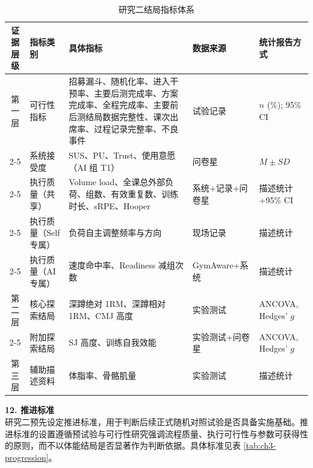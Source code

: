 \documentclass[UTF8,zihao=-4,twoside,openany]{ctexbook}
\begin{document}
\begin{table}[htbp]
  \centering
  \caption{研究二结局指标体系}
  \label{tab:ch3-outcomes}
  \vspace{6pt}
  \fontsize{8.5pt}{11pt}\selectfont
  \begin{tabularx}{\textwidth}{|c|m{2.5cm}|X|m{2.5cm}|m{2.5cm}|}
    \hline
    \textbf{证据层级} & \textbf{指标类别} & \textbf{具体指标} & \textbf{数据来源} & \textbf{统计报告方式} \\ \hline
    第一层 & 可行性指标 & 招募漏斗、随机化率、进入干预率、主要后测完成率、方案完成率、全程完成率、主要前后测结局数据完整性、课次出席率、过程记录完整率、不良事件 & 试验记录 & $n$ (\%); 95\% CI \\ \cline{2-5}
          & 系统接受度 & SUS、PU、Trust、使用意愿（AI 组 T1） & 问卷星 & $M \pm SD$ \\ \cline{2-5}
          & 执行质量（共享） & Volume load、全课总外部负荷、组数、有效重复数、训练时长、sRPE、Hooper & 系统+记录+问卷星 & 描述统计+95\% CI \\ \cline{2-5}
          & 执行质量（Self专属） & 负荷自主调整频率与方向 & 现场记录 & 描述统计 \\ \cline{2-5}
          & 执行质量（AI专属） & 速度命中率、Readiness 减组次数 & GymAware+系统 & 描述统计 \\ \hline
    第二层 & 核心探索结局 & 深蹲绝对 1RM、深蹲相对 1RM、CMJ 高度 & 实验测试 & ANCOVA, Hedges' $g$ \\ \cline{2-5}
          & 附加探索结局 & SJ 高度、训练自我效能 & 实验测试+问卷星 & ANCOVA, Hedges' $g$ \\ \hline
    第三层 & 辅助描述资料 & 体脂率、骨骼肌量 & 实验测试 & 描述统计 \\ \hline
  \end{tabularx}
\end{table}

\vspace{0.2cm}
\noindent \textbf{12. 推进标准} \\
研究二预先设定推进标准，用于判断后续正式随机对照试验是否具备实施基础。推进标准的设置遵循预试验与可行性研究强调流程质量、执行可行性与参数可获得性的原则，而不以体能结局是否显著作为判断依据。具体标准见表 \ref{tab:ch3-progression}。
\end{document}

